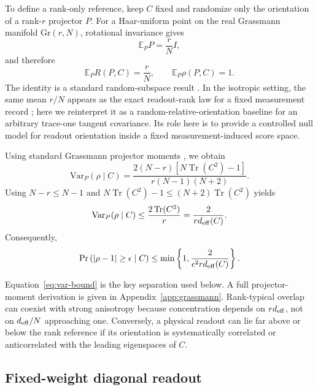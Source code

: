 \documentclass[aps,pra,reprint,superscriptaddress,nofootinbib,longbibliography]{revtex4-2}
\newcommand{\Tr}{\operatorname{Tr}}
\newcommand{\deff}{d_{\rm eff}}
\begin{document}
To define a rank-only reference, keep $C$ fixed and randomize only the orientation of a rank-$r$ projector $P$. For a Haar-uniform point on the real Grassmann manifold $\mathrm{Gr}(r,N)$, rotational invariance gives
\begin{equation}
\mathbb{E}_P P=\frac{r}{N}I,
\end{equation}
and therefore
\begin{equation}
\mathbb{E}_P R(P,C)=\frac{r}{N},
\qquad
\mathbb{E}_P\rho(P,C)=1.
\label{eq:rank-baseline}
\end{equation}
The identity is a standard random-subspace result \cite{CollinsMatsumoto2017,Bendokat2024,Fernandez2025}. In the isotropic setting, the same mean $r/N$ appears as the exact readout-rank law for a fixed measurement record \cite{AitHaddou2026IsotropicRankLaws}; here we reinterpret it as a random-relative-orientation baseline for an arbitrary trace-one tangent covariance. Its role here is to provide a controlled null model for readout orientation inside a fixed measurement-induced score space.

Using standard Grassmann projector moments \cite{CollinsMatsumoto2017}, we obtain
\begin{equation}
\mathrm{Var}_P(\rho\mid C)
=\frac{2(N-r)\left[N\Tr(C^2)-1\right]}
{r(N-1)(N+2)}.
\label{eq:exact-var}
\end{equation}
Using $N-r\le N-1$ and $N\Tr(C^2)-1\le(N+2)\Tr(C^2)$ yields
\begin{equation}
\mathrm{Var}_P(\rho\mid C)
\le \frac{2\Tr(C^2)}{r}
=\frac{2}{r\deff(C)}.
\label{eq:var-bound}
\end{equation}
Consequently,
\begin{equation}
\Pr\left(|\rho-1|\ge\epsilon\mid C\right)
\le
\min\left\{1,\frac{2}{\epsilon^2r\deff(C)}\right\}.
\label{eq:cheb}
\end{equation}

Equation~\eqref{eq:var-bound} is the key separation used below. A full projector-moment derivation is given in Appendix~\ref{app:grassmann}. Rank-typical overlap can coexist with strong anisotropy because concentration depends on $r\deff$, not on $\deff/N$ approaching one. Conversely, a physical readout can lie far above or below the rank reference if its orientation is systematically correlated or anticorrelated with the leading eigenspaces of $C$.

\subsection{Fixed-weight diagonal readout}
\end{document}
